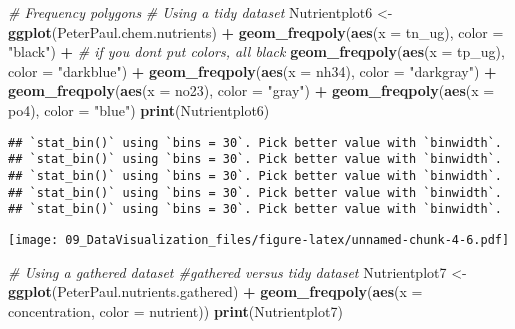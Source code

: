 \documentclass[]{article}
\newenvironment{Shaded}{\begin{snugshade}}{\end{snugshade}}
\newcommand{\KeywordTok}[1]{\textcolor[rgb]{0.13,0.29,0.53}{\textbf{#1}}}
\newcommand{\DataTypeTok}[1]{\textcolor[rgb]{0.13,0.29,0.53}{#1}}
\newcommand{\StringTok}[1]{\textcolor[rgb]{0.31,0.60,0.02}{#1}}
\newcommand{\CommentTok}[1]{\textcolor[rgb]{0.56,0.35,0.01}{\textit{#1}}}
\newcommand{\OperatorTok}[1]{\textcolor[rgb]{0.81,0.36,0.00}{\textbf{#1}}}
\newcommand{\NormalTok}[1]{#1}
\begin{document}
\begin{Shaded}
\begin{Highlighting}[]
\CommentTok{# Frequency polygons}
\CommentTok{# Using a tidy dataset}
\NormalTok{Nutrientplot6 <-}
\StringTok{  }\KeywordTok{ggplot}\NormalTok{(PeterPaul.chem.nutrients) }\OperatorTok{+}
\StringTok{  }\KeywordTok{geom_freqpoly}\NormalTok{(}\KeywordTok{aes}\NormalTok{(}\DataTypeTok{x =}\NormalTok{ tn_ug), }\DataTypeTok{color =} \StringTok{"black"}\NormalTok{) }\OperatorTok{+}\StringTok{   }\CommentTok{# if you dont put colors, all black}
\StringTok{  }\KeywordTok{geom_freqpoly}\NormalTok{(}\KeywordTok{aes}\NormalTok{(}\DataTypeTok{x =}\NormalTok{ tp_ug), }\DataTypeTok{color =} \StringTok{"darkblue"}\NormalTok{) }\OperatorTok{+}
\StringTok{  }\KeywordTok{geom_freqpoly}\NormalTok{(}\KeywordTok{aes}\NormalTok{(}\DataTypeTok{x =}\NormalTok{ nh34), }\DataTypeTok{color =} \StringTok{"darkgray"}\NormalTok{) }\OperatorTok{+}
\StringTok{  }\KeywordTok{geom_freqpoly}\NormalTok{(}\KeywordTok{aes}\NormalTok{(}\DataTypeTok{x =}\NormalTok{ no23), }\DataTypeTok{color =} \StringTok{"gray"}\NormalTok{) }\OperatorTok{+}
\StringTok{  }\KeywordTok{geom_freqpoly}\NormalTok{(}\KeywordTok{aes}\NormalTok{(}\DataTypeTok{x =}\NormalTok{ po4), }\DataTypeTok{color =} \StringTok{"blue"}\NormalTok{) }
\KeywordTok{print}\NormalTok{(Nutrientplot6)}
\end{Highlighting}
\end{Shaded}

\begin{verbatim}
## `stat_bin()` using `bins = 30`. Pick better value with `binwidth`.
## `stat_bin()` using `bins = 30`. Pick better value with `binwidth`.
## `stat_bin()` using `bins = 30`. Pick better value with `binwidth`.
## `stat_bin()` using `bins = 30`. Pick better value with `binwidth`.
## `stat_bin()` using `bins = 30`. Pick better value with `binwidth`.
\end{verbatim}

\texttt{[image: 09\_DataVisualization\_files/figure-latex/unnamed-chunk-4-6.pdf]}

\begin{Shaded}
\begin{Highlighting}[]
\CommentTok{# Using a gathered dataset    #gathered versus tidy dataset}
\NormalTok{Nutrientplot7 <-}\StringTok{   }
\StringTok{  }\KeywordTok{ggplot}\NormalTok{(PeterPaul.nutrients.gathered) }\OperatorTok{+}
\StringTok{  }\KeywordTok{geom_freqpoly}\NormalTok{(}\KeywordTok{aes}\NormalTok{(}\DataTypeTok{x =}\NormalTok{ concentration, }\DataTypeTok{color =}\NormalTok{ nutrient))}
\KeywordTok{print}\NormalTok{(Nutrientplot7)}
\end{Highlighting}
\end{Shaded}
\end{document}
